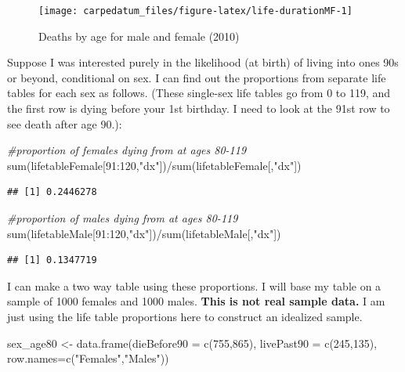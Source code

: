 \documentclass[
  openany]{book}
\newenvironment{Shaded}{\begin{snugshade}}{\end{snugshade}}
\newcommand{\AttributeTok}[1]{\textcolor[rgb]{0.77,0.63,0.00}{#1}}
\newcommand{\CommentTok}[1]{\textcolor[rgb]{0.56,0.35,0.01}{\textit{#1}}}
\newcommand{\DecValTok}[1]{\textcolor[rgb]{0.00,0.00,0.81}{#1}}
\newcommand{\FunctionTok}[1]{\textcolor[rgb]{0.00,0.00,0.00}{#1}}
\newcommand{\NormalTok}[1]{#1}
\newcommand{\OtherTok}[1]{\textcolor[rgb]{0.56,0.35,0.01}{#1}}
\newcommand{\SpecialCharTok}[1]{\textcolor[rgb]{0.00,0.00,0.00}{#1}}
\newcommand{\StringTok}[1]{\textcolor[rgb]{0.31,0.60,0.02}{#1}}
\begin{document}
\begin{figure}[H]

{\centering \texttt{[image: carpedatum\_files/figure-latex/life-durationMF-1]} 

}

\caption{Deaths by age for male and female (2010)}\label{fig:life-durationMF}
\end{figure}

Suppose I was interested purely in the likelihood (at birth) of living into ones 90s or beyond, conditional on sex. I can find out the proportions from separate life tables for each sex as follows. (These single-sex life tables go from 0 to 119, and the first row is dying before your 1st birthday. I need to look at the 91st row to see death after age 90.):

\begin{Shaded}
\begin{Highlighting}[]
\CommentTok{\#proportion of females dying from at ages 80{-}119}
\FunctionTok{sum}\NormalTok{(lifetableFemale[}\DecValTok{91}\SpecialCharTok{:}\DecValTok{120}\NormalTok{,}\StringTok{"dx"}\NormalTok{])}\SpecialCharTok{/}\FunctionTok{sum}\NormalTok{(lifetableFemale[,}\StringTok{"dx"}\NormalTok{])}
\end{Highlighting}
\end{Shaded}

\begin{verbatim}
## [1] 0.2446278
\end{verbatim}

\begin{Shaded}
\begin{Highlighting}[]
\CommentTok{\#proportion of males dying from at ages 80{-}119}
\FunctionTok{sum}\NormalTok{(lifetableMale[}\DecValTok{91}\SpecialCharTok{:}\DecValTok{120}\NormalTok{,}\StringTok{"dx"}\NormalTok{])}\SpecialCharTok{/}\FunctionTok{sum}\NormalTok{(lifetableMale[,}\StringTok{"dx"}\NormalTok{])}
\end{Highlighting}
\end{Shaded}

\begin{verbatim}
## [1] 0.1347719
\end{verbatim}

I can make a two way table using these proportions. I will base my table on a sample of 1000 females and 1000 males. \textbf{This is not real sample data.} I am just using the life table proportions here to construct an idealized sample.

\begin{Shaded}
\begin{Highlighting}[]
\NormalTok{sex\_age80 }\OtherTok{\textless{}{-}} \FunctionTok{data.frame}\NormalTok{(}\AttributeTok{dieBefore90 =} \FunctionTok{c}\NormalTok{(}\DecValTok{755}\NormalTok{,}\DecValTok{865}\NormalTok{), }\AttributeTok{livePast90 =} \FunctionTok{c}\NormalTok{(}\DecValTok{245}\NormalTok{,}\DecValTok{135}\NormalTok{), }
                        \AttributeTok{row.names=}\FunctionTok{c}\NormalTok{(}\StringTok{"Females"}\NormalTok{,}\StringTok{"Males"}\NormalTok{))}
\end{Highlighting}
\end{Shaded}
\end{document}
